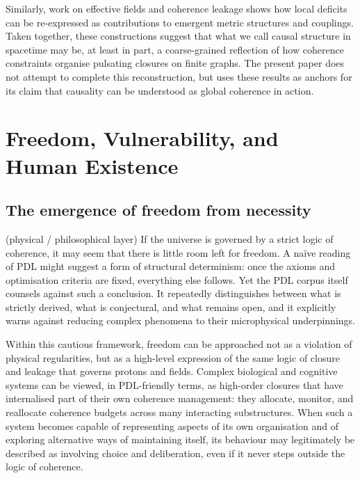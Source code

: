\documentclass[11pt,a4paper]{article}
\theoremstyle{definition}
\begin{document}
Similarly, work on effective fields and coherence leakage shows how local deficits can be re-expressed as contributions to emergent metric structures and couplings.\cite{Laubscher_EffectiveFields_2024,Laubscher_UniversalCoherenceLeakage_2024} Taken together, these constructions suggest that what we call causal structure in spacetime may be, at least in part, a coarse-grained reflection of how coherence constraints organise pulsating closures on finite graphs. The present paper does not attempt to complete this reconstruction, but uses these results as anchors for its claim that causality can be understood as global coherence in action.

\section{Freedom, Vulnerability, and Human Existence}
\label{sec:freedom_human}

\subsection{The emergence of freedom from necessity}

(physical / philosophical layer) If the universe is governed by a strict logic of coherence, it may seem that there is little room left for freedom. A naïve reading of PDL might suggest a form of structural determinism: once the axioms and optimisation criteria are fixed, everything else follows. Yet the PDL corpus itself counsels against such a conclusion. It repeatedly distinguishes between what is strictly derived, what is conjectural, and what remains open, and it explicitly warns against reducing complex phenomena to their microphysical underpinnings.\cite{Laubscher_Existence_PulsatingClosure_2026,Laubscher_PDL_Position_2024}

Within this cautious framework, freedom can be approached not as a violation of physical regularities, but as a high-level expression of the same logic of closure and leakage that governs protons and fields. Complex biological and cognitive systems can be viewed, in PDL-friendly terms, as high-order closures that have internalised part of their own coherence management: they allocate, monitor, and reallocate coherence budgets across many interacting substructures.\cite{Laubscher_Existence_PulsatingClosure_2026} When such a system becomes capable of representing aspects of its own organisation and of exploring alternative ways of maintaining itself, its behaviour may legitimately be described as involving choice and deliberation, even if it never steps outside the logic of coherence.
\end{document}
